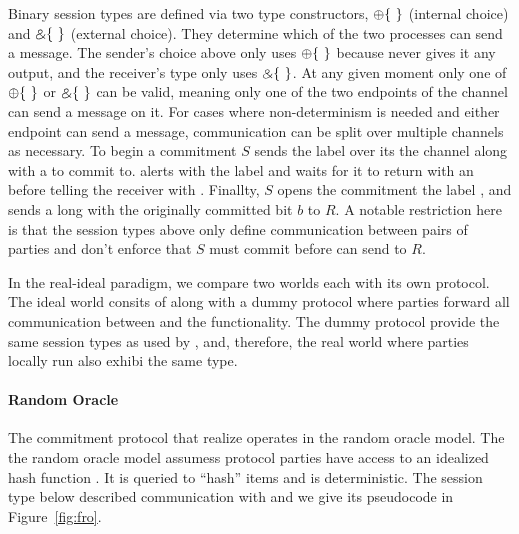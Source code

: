 
Binary session types are defined via two type constructors, $\ichoice$ (internal choice) and $\echoice$ (external choice). 
They determine which of the two processes can send a message.
The sender's choice above only uses $\ichoice$ because \Fcom never gives it any output, and the receiver's type only uses $\echoice$.
At any given moment only one of $\ichoice$ or $\echoice$ can be valid, meaning only one of the two endpoints of the channel can send a message on it.
For cases where non-determinism is needed and either endpoint can send a message, communication can be split over multiple channels as necessary.
To begin a commitment $S$ sends the label  over its the channel along with a  to commit to.
\Fcom alerts \A with the label  and waits for it to return with an  before telling the receiver with .
Finallty, $S$ opens the commitment the label , and \Fcom sends  a long with the originally committed bit $b$ to $R$.
A notable restriction here is that the session types above only define communication between pairs of parties and don't enforce that $S$ must commit before \Fcom can send  to $R$.

In the real-ideal paradigm, we compare two worlds each with its own protocol.
The ideal world consits of \Fcom along with a dummy protocol where parties forward all communication between \Z and the functionality.
The dummy protocol provide the same session types as used by \Fcom, and, therefore, the real world where parties locally run \protcom also exhibi the same type.



\paragraph{Random Oracle}
The commitment protocol \protcom that realize \Fcom operates in the random oracle model. 
The the random oracle model assumess protocol parties have access to an idealized hash function \Fro.
It is queried to ``hash'' items and is deterministic. 
The session type below described communication with \Fro and we give its pseudocode in Figure~\ref{fig:fro}.

